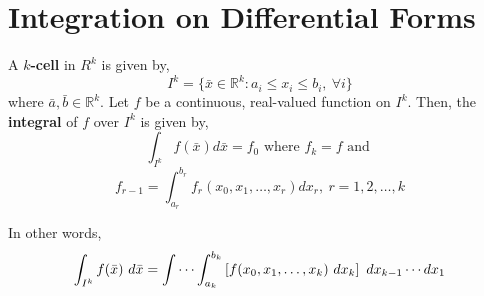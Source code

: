 \section{Integration on Differential Forms}
\begin{definition}
	A \textbf{$k$-cell} in $R^k$ is given by, 
	\[ I^k = \{ \bar{x} \in \mathbb{R}^k : a_i \le x_i \le b_i,\ \forall i \} \]
	where $\bar{a},\bar{b} \in \mathbb{R}^k$.
	Let $f$ be a continuous, real-valued function on $I^k$.
	Then, the \textbf{integral} of $f$ over $I^k$ is given by,
	\[ \int_{I^k}f(\bar{x}) d\bar{x} = f_0 \text{ where } f_k = f \text{ and } \]
	\[ f_{r-1} = \int_{a_r}^{b_r} f_r(x_0,x_1,\dots,x_r) dx_r,\ r = 1,2,\dots,k \]
\begin{commentary}
	In other words,
	\[ \int_{I^k} f(\bar{x})\ d\bar{x} = \idotsint_{a_k}^{b_k} \left[f(x_0,x_1,\dots,x_k)\ dx_k\right]\ dx_{k-1} \dotsm dx_1 \]
\end{commentary}
\end{definition}

